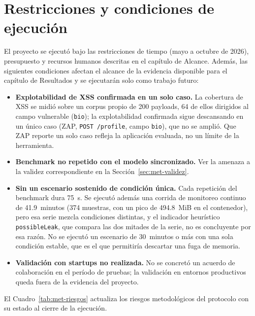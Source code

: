 \section{Restricciones y condiciones de ejecución}
\label{sec:met-restricciones}

El proyecto se ejecutó bajo las restricciones de tiempo (mayo a octubre de 2026), presupuesto y
recursos humanos descritas en el capítulo de Alcance. Además, las siguientes condiciones afectan
el alcance de la evidencia disponible para el capítulo de Resultados y se ejecutarán solo como
trabajo futuro:

\begin{itemize}
        \item \textbf{Explotabilidad de XSS confirmada en un solo caso.} La cobertura de XSS se midió
    sobre un corpus propio de 200 payloads, 64 de ellos dirigidos al campo vulnerable
    (\texttt{bio}); la explotabilidad confirmada sigue descansando en un único caso (ZAP,
    \texttt{POST /profile}, campo \texttt{bio}), que no se amplió. Que ZAP reporte un solo caso
    refleja la aplicación evaluada, no un límite de la herramienta.
    \item \textbf{Benchmark no repetido con el modelo sincronizado.} Ver la amenaza a la validez
    correspondiente en la Sección~\ref{sec:met-validez}.
    \item \textbf{Sin un escenario sostenido de condición única.} Cada repetición del benchmark
    dura 75~s. Se ejecutó además una corrida de monitoreo continuo de 41.9~minutos (374 muestras,
    con un pico de 494.8~MiB en el contenedor), pero esa serie mezcla condiciones distintas, y el
    indicador heurístico \texttt{possibleLeak}, que compara las dos mitades de la serie, no es
    concluyente por esa razón. No se ejecutó un escenario de 30~minutos o más con una sola condición
    estable, que es el que permitiría descartar una fuga de memoria.
    \item \textbf{Validación con startups no realizada.} No se concretó un acuerdo de
    colaboración en el período de pruebas; la validación en entornos productivos queda fuera de
    la evidencia del proyecto.
\end{itemize}

El Cuadro~\ref{tab:met-riesgos} actualiza los riesgos metodológicos del protocolo con su
estado al cierre de la ejecución.

